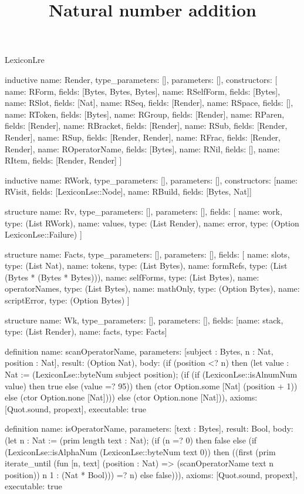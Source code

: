 \begin{lexlean}{LexiconLre}
\title{Natural number addition}
\begin{semanticmodule}
inductive{
  name: Render,
  type_parameters: [],
  parameters: [],
  constructors: [
    {name: RForm, fields: [Bytes, Bytes, Bytes]},
    {name: RSelfForm, fields: [Bytes]},
    {name: RSlot, fields: [Nat]},
    {name: RSeq, fields: [Render]},
    {name: RSpace, fields: []},
    {name: RToken, fields: [Bytes]},
    {name: RGroup, fields: [Render]},
    {name: RParen, fields: [Render]},
    {name: RBracket, fields: [Render]},
    {name: RSub, fields: [Render, Render]},
    {name: RSup, fields: [Render, Render]},
    {name: RFrac, fields: [Render, Render]},
    {name: ROperatorName, fields: [Bytes]},
    {name: RNil, fields: []},
    {name: RItem, fields: [Render, Render]}
  ]
}

inductive{
  name: RWork,
  type_parameters: [],
  parameters: [],
  constructors: [{name: RVisit, fields: [LexiconLse::Node]}, {name: RBuild, fields: [Bytes, Nat]}]
}

structure{
  name: Rv,
  type_parameters: [],
  parameters: [],
  fields: [
    {name: work, type: (List RWork)},
    {name: values, type: (List Render)},
    {name: error, type: (Option LexiconLse::Failure)}
  ]
}

structure{
  name: Facts,
  type_parameters: [],
  parameters: [],
  fields: [
    {name: slots, type: (List Nat)},
    {name: tokens, type: (List Bytes)},
    {name: formRefs, type: (List (Bytes * (Bytes * Bytes)))},
    {name: selfForms, type: (List Bytes)},
    {name: operatorNames, type: (List Bytes)},
    {name: mathOnly, type: (Option Bytes)},
    {name: scriptError, type: (Option Bytes)}
  ]
}

structure{
  name: Wk,
  type_parameters: [],
  parameters: [],
  fields: [{name: stack, type: (List Render)}, {name: facts, type: Facts}]
}

definition{
  name: scanOperatorName,
  parameters: [subject : Bytes, n : Nat, position : Nat],
  result: (Option Nat),
  body: (if (position <? n) then (let value : Nat := (LexiconLse::byteNum subject position); (if (if (LexiconLse::isAlnumNum value) then true else (value =? 95)) then (ctor Option.some [Nat] (position + 1)) else (ctor Option.none [Nat]))) else (ctor Option.none [Nat])),
  axioms: [Quot.sound, propext],
  executable: true
}

definition{
  name: isOperatorName,
  parameters: [text : Bytes],
  result: Bool,
  body: (let n : Nat := (prim length text : Nat); (if (n =? 0) then false else (if (LexiconLse::isAlphaNum (LexiconLse::byteNum text 0)) then ((first (prim iterate_until (fun [n, text] (position : Nat) => (scanOperatorName text n position)) n 1 : (Nat * Bool))) =? n) else false))),
  axioms: [Quot.sound, propext],
  executable: true
}


\end{semanticmodule}
\end{lexlean}
